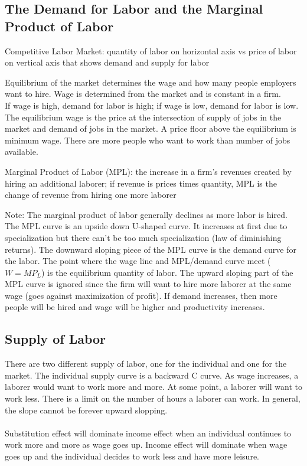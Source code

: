 \documentclass[12pt]{article}
\begin{document}
\subsection{The Demand for Labor and the Marginal Product of Labor}
\begin{definition} Competitive Labor Market: quantity of labor on horizontal axis vs price of labor on vertical axis that shows demand and supply for labor \end{definition} 
Equilibrium of the market determines the wage and how many people employers want to hire. 
Wage is determined from the market and is constant in a firm. \\ 
 If wage is high, demand for labor is high; if wage is low, demand for labor is low. 
The equilibrium wage is the price at the intersection of supply of jobs in the market and demand of jobs in the market. A price floor above the equilibrium is minimum wage. There are more people who want to work than number of jobs available. 
\begin{definition} Marginal Product of Labor (MPL): the increase in a firm's revenues created by hiring an additional laborer; if revenue is prices times quantity, MPL is the change of revenue from hiring one more laborer \end{definition}
Note: The marginal product of labor generally declines as more labor is hired. \\
The MPL curve is an upside down U-shaped curve. It increases at first due to specialization but there can't be too much specialization (law of diminishing returns). The downward sloping piece of the MPL curve is the demand curve for the labor. The point where the wage line and MPL/demand curve meet ($W = MP_L$) is the equilibrium quantity of labor. The upward sloping part of the MPL curve is ignored since the firm will want to hire more laborer at the same wage (goes against maximization of profit). 
If demand increases, then more people will be hired and wage will be higher and productivity increases.

\subsection{Supply of Labor}
There are two different supply of labor, one for the individual and one for the market. The individual supply curve is a backward C curve. As wage increases, a laborer would want to work more and more. At some point, a laborer will want to work less. There is a limit on the number of hours a laborer can work. In general, the slope cannot be forever upward slopping. \\~\\
Substitution effect will dominate income effect when an individual continues to work more and more as wage goes up. Income effect will dominate when wage goes up and the individual decides to work less and have more leisure. 
\end{document}

